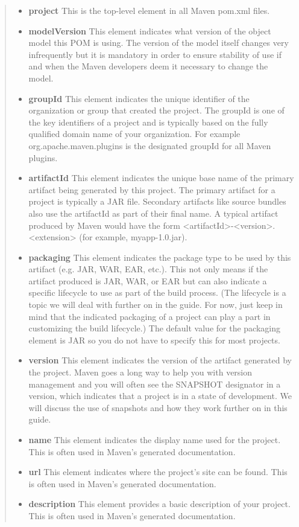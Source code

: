 \begin{quotation}
	\begin{itemize} 
		\item \textbf{project} This is the top-level element in all Maven pom.xml files.
		\item \textbf{modelVersion} This element indicates what version of the object model this POM is using. The version of the model itself changes very infrequently but it is mandatory in order to ensure stability of use if and when the Maven developers deem it necessary to change the model.
		\item \textbf{groupId} This element indicates the unique identifier of the organization or group that created the project. The groupId is one of the key identifiers of a project and is typically based on the fully qualified domain name of your organization. For example org.apache.maven.plugins is the designated groupId for all Maven plugins.
		\item \textbf{artifactId} This element indicates the unique base name of the primary artifact being generated by this project. The primary artifact for a project is typically a JAR file. Secondary artifacts like source bundles also use the artifactId as part of their final name. A typical artifact produced by Maven would have the form <artifactId>-<version>.<extension> (for example, myapp-1.0.jar).
		\item \textbf{packaging} This element indicates the package type to be used by this artifact (e.g. JAR, WAR, EAR, etc.). This not only means if the artifact produced is JAR, WAR, or EAR but can also indicate a specific lifecycle to use as part of the build process. (The lifecycle is a topic we will deal with further on in the guide. For now, just keep in mind that the indicated packaging of a project can play a part in customizing the build lifecycle.) The default value for the packaging element is JAR so you do not have to specify this for most projects.
		\item \textbf{version} This element indicates the version of the artifact generated by the project. Maven goes a long way to help you with version management and you will often see the SNAPSHOT designator in a version, which indicates that a project is in a state of development. We will discuss the use of snapshots and how they work further on in this guide.
		\item \textbf{name} This element indicates the display name used for the project. This is often used in Maven's generated documentation.
		\item \textbf{url} This element indicates where the project's site can be found. This is often used in Maven's generated documentation.
		\item \textbf{description} This element provides a basic description of your project. This is often used in Maven's generated documentation.
	\end{itemize}
\end{quotation} 

